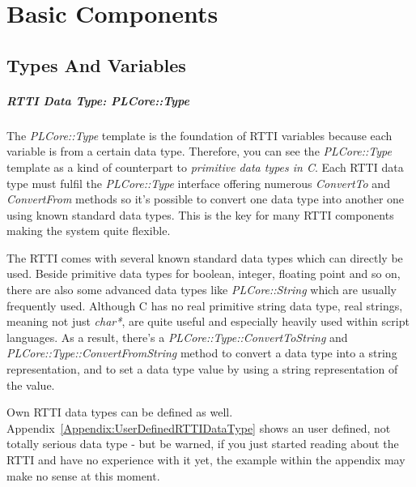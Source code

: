 \chapter{Basic Components}




\section{Types And Variables}
\paragraph{RTTI Data Type: PLCore::Type}
The \emph{PLCore::Type} template is the foundation of RTTI variables because each variable is from a certain data type. Therefore, you can see the \emph{PLCore::Type} template as a kind of counterpart to \emph{primitive data types in C}. Each RTTI data type must fulfil the \emph{PLCore::Type} interface offering numerous \emph{ConvertTo} and \emph{ConvertFrom} methods so it's possible to convert one data type into another one using known standard data types. This is the key for many RTTI components making the system quite flexible.

The RTTI comes with several known standard data types which can directly be used. Beside primitive data types for boolean, integer, floating point and so on, there are also some advanced data types like \emph{PLCore::String} which are usually frequently used. Although C has no real primitive string data type, real strings, meaning not just \emph{char*}, are quite useful and especially heavily used within script languages. As a result, there's a \emph{PLCore::Type::ConvertToString} and \emph{PLCore::Type::ConvertFromString} method to convert a data type into a string representation, and to set a data type value by using a string representation of the value.

Own RTTI data types can be defined as well. Appendix~\ref{Appendix:UserDefinedRTTIDataType} shows an user defined, not totally serious data type - but be warned, if you just started reading about the RTTI and have no experience with it yet, the example within the appendix may make no sense at this moment.


